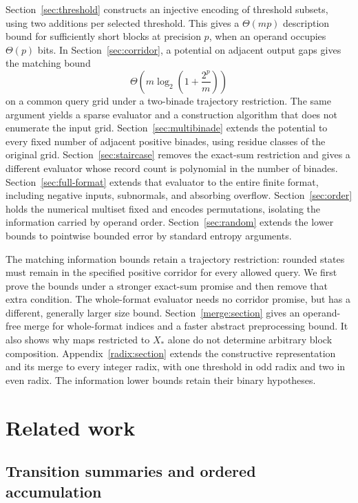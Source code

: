 \documentclass[11pt,reqno]{amsart}
\theoremstyle{definition}
\theoremstyle{remark}
\numberwithin{equation}{section}
\begin{document}
Section~\ref{sec:threshold} constructs an injective encoding of threshold
subsets, using two additions per selected threshold. This gives a
$\Theta(mp)$ description bound for sufficiently short blocks at precision
$p$, when an operand occupies $\Theta(p)$ bits. In
Section~\ref{sec:corridor}, a potential on adjacent output gaps gives the
matching bound
\[
 \Theta\!\left(m\log_2\left(1+\frac{2^p}{m}\right)\right)
\]
on a common query grid under a two-binade trajectory restriction. The same
argument yields a sparse evaluator and a construction algorithm that does
not enumerate the input grid. Section~\ref{sec:multibinade} extends the
potential to every fixed number of adjacent positive binades, using residue
classes of the original grid. Section~\ref{sec:staircase} removes the
exact-sum restriction and gives a different evaluator whose record count
is polynomial in the number of binades. Section~\ref{sec:full-format}
extends that evaluator to the entire finite format, including negative
inputs, subnormals, and absorbing overflow. Section~\ref{sec:order} holds the numerical
multiset fixed and encodes permutations, isolating the information carried
by operand order. Section~\ref{sec:random} extends the lower bounds to
pointwise bounded error by standard entropy arguments.

The matching information bounds retain a trajectory restriction: rounded
states must remain in the specified positive corridor for every allowed
query. We first prove the bounds under a stronger exact-sum promise and
then remove that extra condition. The whole-format evaluator needs no
corridor promise, but has a different, generally larger size bound.
Section~\ref{merge:section} gives an operand-free merge for whole-format
indices and a faster abstract preprocessing bound. It also shows why maps
restricted to $X_\ast$ alone do not determine arbitrary block composition.
Appendix~\ref{radix:section} extends the constructive representation and
its merge to every integer radix, with one threshold in odd radix and
two in even radix. The information lower bounds retain their binary
hypotheses.

\section{Related work}\label{sec:related}

\subsection{Transition summaries and ordered accumulation}
\end{document}
